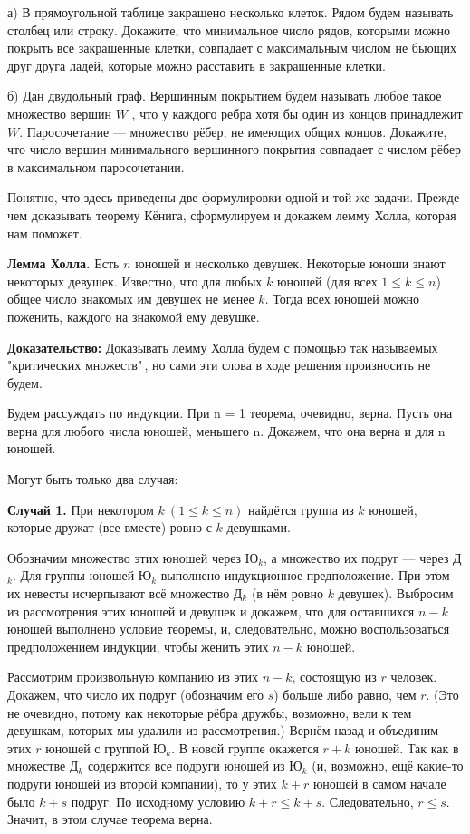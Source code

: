 а) В прямоугольной таблице закрашено несколько клеток. Рядом будем называть столбец или строку. Докажите, что минимальное число рядов, которыми можно покрыть все закрашенные клетки, совпадает с максимальным числом не бьющих друг друга ладей, которые можно расставить в закрашенные клетки.

б) Дан двудольный граф. Вершинным покрытием будем называть любое такое множество
вершин $W$ , что у каждого ребра хотя бы один из концов принадлежит $W$. Паросочетание --- множество рёбер, не имеющих общих концов. Докажите, что число вершин минимального вершинного покрытия совпадает с числом рёбер в максимальном паросочетании.

Понятно, что здесь приведены две формулировки одной и той же задачи. Прежде чем доказывать теорему Кёнига, сформулируем и докажем лемму Холла, которая нам поможет.

\textbf{Лемма Холла.} Есть $n$ юношей и несколько девушек. Некоторые
юноши знают некоторых девушек. Известно, что для любых $k$ юношей (для всех $1 \leq k \leq n$) общее число знакомых им девушек не менее $k$. Тогда всех юношей можно поженить, каждого на знакомой ему девушке.

\textbf{Доказательство:} Доказывать лемму Холла будем с помощью так называемых "критических множеств"\,, но сами эти слова в ходе решения произносить не будем.

Будем рассуждать по индукции. При n = 1 теорема, очевидно, верна. Пусть она верна для любого числа юношей, меньшего n. Докажем, что она верна и для n юношей.

Могут быть только два случая:

\textbf{Случай 1.} При некотором $k \ (1 \leq k \leq n)$ найдётся группа из $k$ юношей, которые дружат (все вместе) ровно с $k$ девушками.

Обозначим множество этих юношей через Ю$_k$, а множество их подруг — через Д$_k$. Для группы юношей Ю$_k$ выполнено индукционное предположение. При этом их невесты исчерпывают всё множество Д$_k$ (в нём ровно $k$ девушек). Выбросим из рассмотрения этих юношей и девушек и докажем, что для оставшихся $n-k$ юношей выполнено условие теоремы, и, следовательно, можно воспользоваться предположением индукции, чтобы женить этих $n-k$ юношей.

Рассмотрим произвольную компанию из этих $n-k$, состоящую из $r$ человек. Докажем, что число их подруг (обозначим его $s$) больше либо равно, чем $r$. (Это не очевидно, потому как некоторые рёбра дружбы, возможно, вели к тем девушкам, которых мы удалили из рассмотрения.) Вернём назад и объединим этих $r$ юношей с группой Ю$_k$. В новой группе окажется $r + k$ юношей. Так как в множестве Д$_k$ содержится все подруги юношей из Ю$_k$ (и, возможно, ещё какие-то подруги юношей из второй компании), то у этих $k + r$ юношей в самом начале было $k + s$ подруг. По исходному условию $k + r \leq k + s$. Следовательно, $r \leq s.$ Значит, в этом случае теорема верна. 

